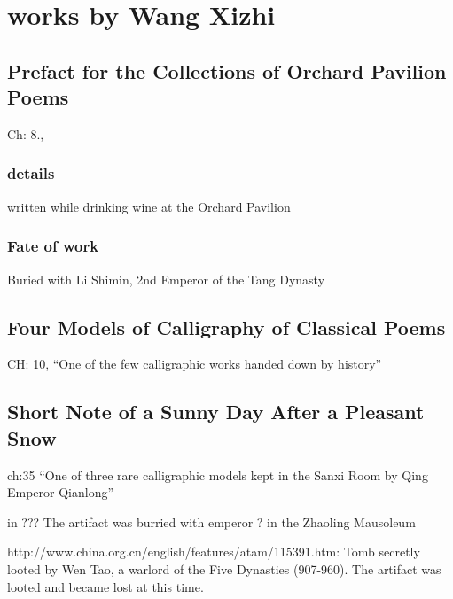 \chapter{works by Wang Xizhi}

\section{Prefact for the Collections of Orchard Pavilion Poems}

Ch: 8.,

\subsection{details}

written while drinking wine at the Orchard Pavilion

\subsection{Fate of work}

Buried with Li Shimin, 2nd Emperor of the Tang Dynasty

\section{Four Models of Calligraphy of Classical Poems}

CH: 10, ``One of the few calligraphic works handed down by history''

\section{Short Note of a Sunny Day After a Pleasant Snow}

ch:35 ``One of three rare calligraphic models kept in the Sanxi Room by Qing Emperor Qianlong''

in ??? The artifact was burried with emperor ? in the Zhaoling Mausoleum

http://www.china.org.cn/english/features/atam/115391.htm:  Tomb secretly looted by Wen Tao, a warlord of the Five Dynasties (907-960).  The artifact was looted and became lost at this time.





